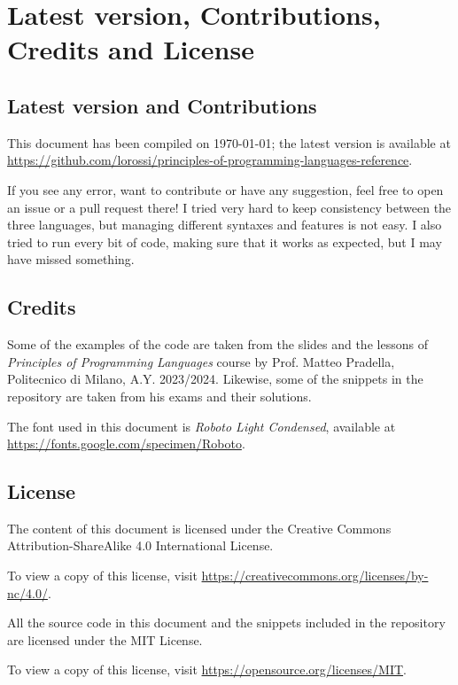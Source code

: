 \documentclass[a4paper,landscape,10pt]{article}
\begin{document}
\clearpage

\section{Latest version, Contributions, Credits and License}

\subsection{Latest version and Contributions}

This document has been compiled on \today;
the latest version is available at \url{https://github.com/lorossi/principles-of-programming-languages-reference}.

If you see any error, want to contribute or have any suggestion, feel free to open an issue or a pull request there!
I tried very hard to keep consistency between the three languages, but managing different syntaxes and features is not easy.
I also tried to run every bit of code, making sure that it works as expected, but I may have missed something.

\bigskip

\subsection{Credits}

Some of the examples of the code are taken from the slides and the lessons of \textit{Principles of Programming Languages} course by Prof. Matteo Pradella, Politecnico di Milano, A.Y. 2023/2024.
Likewise, some of the snippets in the repository are taken from his exams and their solutions.

\smallskip

The font used in this document is \textit{Roboto Light Condensed}, available at \url{https://fonts.google.com/specimen/Roboto}.

\bigskip

\subsection{License}

The content of this document is licensed under the Creative Commons Attribution-ShareAlike 4.0 International License.
\ccbync

To view a copy of this license, visit \url{https://creativecommons.org/licenses/by-nc/4.0/}.

\smallskip

All the source code in this document and the snippets included in the repository are licensed under the MIT License.

To view a copy of this license, visit \url{https://opensource.org/licenses/MIT}.
\end{document}
